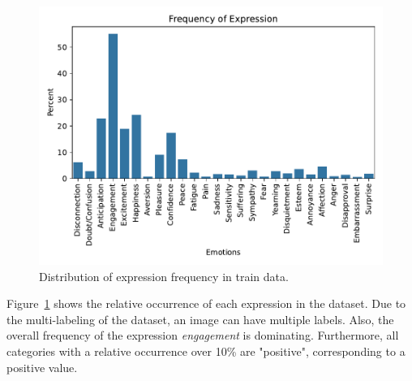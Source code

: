 

\begin{figure}[ht]
    \centering
    \includegraphics[width=\columnwidth]{pictures/emotic/frequency_of_expression.pdf}
    \caption{Distribution of expression frequency in \emotic{} train data.}
    \label{fig:emotic_labeldistr}
\end{figure}

Figure~\ref{fig:emotic_labeldistr} shows the relative occurrence of each expression in the dataset. Due to the multi-labeling of the dataset, an image can have multiple labels. Also, the overall frequency of the expression \textit{engagement} is dominating. %
Furthermore, all categories with a relative occurrence over 10\% are  "positive", corresponding to a positive \val{} value. 

